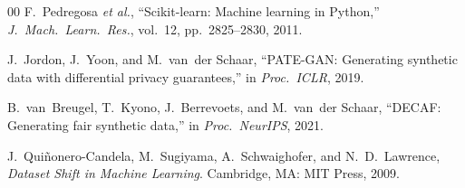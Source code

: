 \documentclass[conference]{IEEEtran}
\begin{document}
\begin{thebibliography}{00}
F.~Pedregosa \emph{et al.}, ``Scikit-learn: Machine learning in Python,'' \emph{J.\ Mach.\ Learn.\ Res.}, vol.~12, pp.~2825--2830, 2011.

J.~Jordon, J.~Yoon, and M.~van~der Schaar, ``PATE-GAN: Generating synthetic data with differential privacy guarantees,'' in \emph{Proc.\ ICLR}, 2019.

B.~van~Breugel, T.~Kyono, J.~Berrevoets, and M.~van~der Schaar, ``DECAF: Generating fair synthetic data,'' in \emph{Proc.\ NeurIPS}, 2021.

J.~Qui\~{n}onero-Candela, M.~Sugiyama, A.~Schwaighofer, and N.~D.~Lawrence, \emph{Dataset Shift in Machine Learning}. Cambridge, MA: MIT Press, 2009.

\end{thebibliography}
\end{document}
